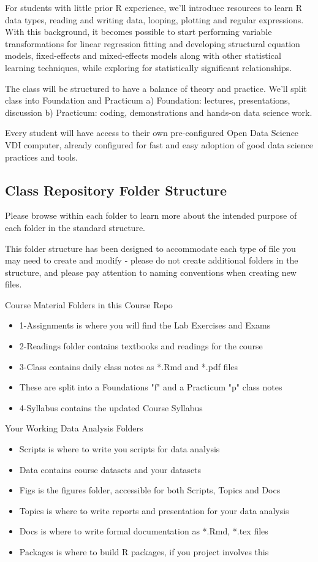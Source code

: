 \documentclass[11pt]{article} %
\begin{document}
For students with little prior R experience, we'll introduce resources to learn R data types, reading and writing data, looping, plotting and regular expressions. 
With this background, it becomes possible to start performing variable transformations for linear regression fitting and developing structural equation models, fixed-effects and mixed-effects models along with other statistical learning techniques, while exploring for statistically significant relationships. 

The class will be structured to have a balance of theory and practice. 
We'll split class into Foundation and Practicum
	a) Foundation: lectures, presentations, discussion
	b) Practicum: coding, demonstrations and hands-on data science work. 

Every student will have access to their own pre-configured Open Data Science VDI computer, already configured for fast and easy adoption of good data science practices and tools. 

\subsection{Class Repository Folder Structure}
  
  Please browse within each folder to learn more about the intended purpose of each folder in the standard structure. 
  
  This folder structure has been designed to accommodate each type of file you may need to create and modify - please do not create additional folders in the structure, and please pay attention to naming conventions when creating new files. 
  
Course Material Folders in this Course Repo
\begin{itemize}
  \item 1-Assignments is where you will find the Lab Exercises and Exams
  \item 2-Readings folder contains textbooks and readings for the course
  \item 3-Class contains daily class notes as *.Rmd and *.pdf files
  \item These are split into a Foundations "f" and a Practicum "p" class notes
  \item 4-Syllabus contains the updated Course Syllabus
\end{itemize}
  
Your Working Data Analysis Folders
\begin{itemize}
  \item Scripts is where to write you scripts for data analysis
  \item Data contains course datasets and your datasets
  \item Figs is the figures folder, accessible for both Scripts, Topics and Docs
  \item Topics is where to write reports and presentation for your data analysis
  \item Docs is where to write formal documentation as *.Rmd, *.tex files
  \item Packages is where to build R packages, if you project involves this
\end{itemize}
\end{document}
